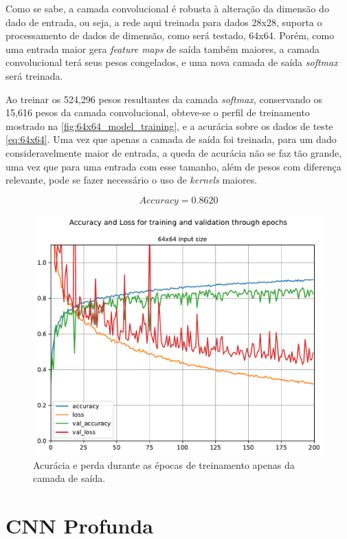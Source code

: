 Como se sabe, a camada convolucional é robusta à alteração da dimensão do dado de entrada, ou seja, a rede aqui treinada para dados 28x28, suporta o processamento de dados de dimensão, como será testado, 64x64. Porém, como uma entrada maior gera \textit{feature maps} de saída também maiores, a camada convolucional terá seus pesos congelados, e uma nova camada de saída \textit{softmax} será treinada.

Ao treinar os 524,296 pesos resultantes da camada \textit{softmax}, conservando os 15,616 pesos da camada convolucional, obteve-se o perfil de treinamento mostrado na \autoref{fig:64x64_model_training}, e a acurácia sobre os dados de teste  \eqref{eq:64x64}. Uma vez que apenas a camada de saída foi treinada, para um dado consideravelmente maior de entrada, a queda de acurácia não se faz tão grande, uma vez que para uma entrada com esse tamanho, além de pesos com diferença relevante, pode se fazer necessário o uso de \textit{kernels} maiores. 

\begin{equation}\label{eq:64x64}
	Accuracy = 0.8620
\end{equation}

\begin{figure}[H]
	\centering
	\includegraphics[width=0.75\linewidth]{../../plot/cnn_shallow/64x64_model_training}
	\caption{Acurácia e perda durante as épocas de treinamento apenas da camada de saída.}
	\label{fig:64x64_model_training}
\end{figure}


\clearpage
\section{CNN Profunda}

